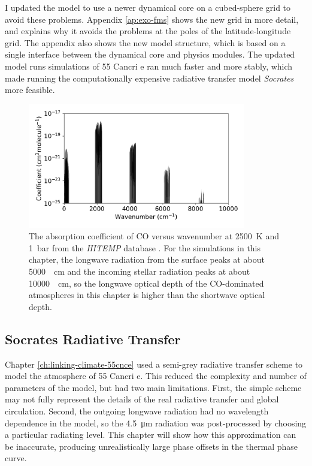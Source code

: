 
I updated the model to use a newer dynamical core on a cubed-sphere grid to avoid these problems. Appendix \ref{ap:exo-fms} shows the new grid in more detail, and explains why it avoids the problems at the poles of the latitude-longitude grid. The appendix also shows the new model structure, which is based on a single interface between the dynamical core and physics modules. The updated model runs simulations of 55 Cancri e ran much faster and more stably, which made running the computationally expensive radiative transfer model \textit{Socrates} more feasible.


\begin{figure}
  \centering
    \includegraphics[width=0.85\textwidth]{figures/soc-lava-planets/co-absorption.pdf}
  \caption{The absorption coefficient of CO versus wavenumber at \SI{2500}{\kelvin} and \SI{1}{\bar} from the \textit{HITEMP} database \citep{rothman2010hitemp}. For the simulations in this chapter, the longwave radiation from the surface peaks at about \SI{5000}{\per\centi\metre} and the incoming stellar radiation peaks at about \SI{10000}{\per\centi\metre}, so the longwave optical depth of the CO-dominated atmospheres in this chapter is higher than the shortwave optical depth.}
  \label{fig:co-absorption}
\end{figure}

\subsection{Socrates Radiative Transfer}

Chapter \ref{ch:linking-climate-55cnce} used a semi-grey radiative transfer scheme to model the atmosphere of 55 Cancri e. This reduced the complexity and number of parameters of the model, but had two main limitations. First, the simple scheme may not fully represent the details of the real radiative transfer and global circulation. Second, the outgoing longwave radiation had no wavelength dependence in the model, so the \SI{4.5}{\micro\metre} radiation was post-processed by choosing a particular radiating level. This chapter will show how this approximation can be inaccurate, producing unrealistically large phase offsets in the thermal phase curve.

